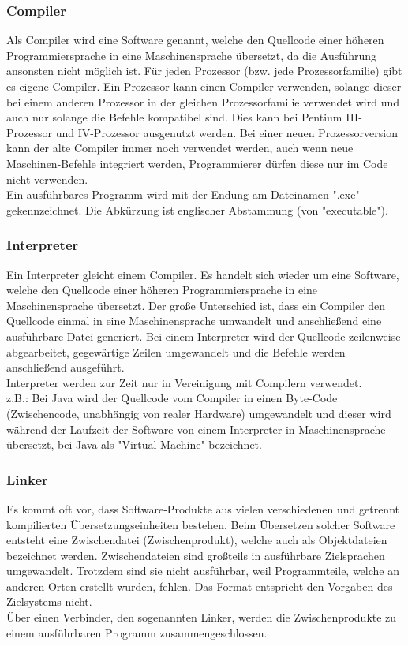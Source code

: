 \documentclass[12pt,a4paper]{report}
\begin{document}
\begin{onehalfspace}
\subsubsection{Compiler}
Als Compiler wird eine Software genannt, welche den Quellcode einer höheren Programmiersprache in eine Maschinensprache übersetzt, da die Ausführung ansonsten nicht möglich ist. Für jeden Prozessor (bzw. jede Prozessorfamilie) gibt es eigene Compiler. Ein Prozessor kann einen Compiler verwenden, solange dieser bei einem anderen Prozessor in der gleichen Prozessorfamilie verwendet wird und auch nur solange die Befehle kompatibel sind. Dies kann bei Pentium III-Prozessor und IV-Prozessor ausgenutzt werden. Bei einer neuen Prozessorversion kann der alte Compiler immer noch verwendet werden, auch wenn neue Maschinen-Befehle integriert werden, Programmierer dürfen diese nur im Code nicht verwenden.\\
Ein ausführbares Programm wird mit der Endung am Dateinamen "{}.exe"{} gekennzeichnet. Die Abkürzung ist englischer Abstammung (von "{}executable"{}).

\subsubsection{Interpreter}
Ein Interpreter gleicht einem Compiler. Es handelt sich wieder um eine Software, welche den Quellcode einer höheren Programmiersprache in eine Maschinensprache übersetzt. Der große Unterschied ist, dass ein Compiler den Quellcode einmal in eine Maschinensprache umwandelt und anschließend eine ausführbare Datei generiert. Bei einem Interpreter wird der Quellcode zeilenweise abgearbeitet, gegewärtige Zeilen umgewandelt und die Befehle werden anschließend ausgeführt.
\\Interpreter werden zur Zeit nur in Vereinigung mit Compilern verwendet. \\
z.B.: Bei Java wird der Quellcode vom Compiler in einen Byte-Code (Zwischencode, unabhängig von realer Hardware) umgewandelt und dieser wird während der Laufzeit der Software von einem Interpreter in Maschinensprache übersetzt, bei Java als "{}Virtual Machine"{} bezeichnet.

\subsubsection{Linker}
Es kommt oft vor, dass Software-Produkte aus vielen verschiedenen und getrennt kompilierten Übersetzungseinheiten bestehen. Beim Übersetzen solcher Software entsteht eine Zwischendatei (Zwischenprodukt), welche auch als Objektdateien bezeichnet werden. Zwischendateien sind großteils in ausführbare Zielsprachen umgewandelt. Trotzdem sind sie nicht ausführbar, weil Programmteile, welche an anderen Orten erstellt wurden, fehlen. Das Format entspricht den Vorgaben des Zielsystems nicht.
\\Über einen Verbinder, den sogenannten Linker, werden die Zwischenprodukte zu einem ausführbaren Programm zusammengeschlossen.


\end{onehalfspace}
\end{document}
